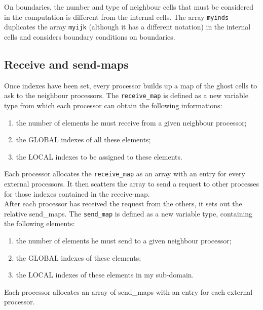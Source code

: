 \begin{enumerate}
On boundaries, the number and type of neighbour cells that must be considered
in the computation is different from the internal cells. The array
{\tt myinds} duplicates the array {\tt myijk} (although it has a different notation)
in the internal cells and considers boundary conditions on boundaries.\\ 
%
\subsection{Receive and send-maps}
%
Once indexes have been set, every processor builds up a map of the ghost cells
to ask to the neighbour processors. The {\tt receive\_map} is 
defined as a new variable type from which each processor can obtain the following informations:
\begin{enumerate}
\item the number of elements he must receive from a given neighbour processor;
\item the GLOBAL indexes of all these elements;
\item the LOCAL indexes to be assigned to these elements.
\end{enumerate}
Each processor allocates the {\tt receive\_map} as an array with an entry for every 
external processors. It then scatters the array to send a request to other 
processes for those indexes contained in the receive-map.\\
After each processor has received the request from the others,
it sets out the relative send\_maps. The {\tt send\_map} is defined as a new variable
type, containing the following elements:
\begin{enumerate}
\item the number of elements he must send to a given neighbour processor;
\item the GLOBAL indexes of these elements;
\item the LOCAL indexes of these elements in my sub-domain.
\end{enumerate}
Each processor allocates an array of send\_maps with an entry for each external processor.
%

\end{enumerate}
